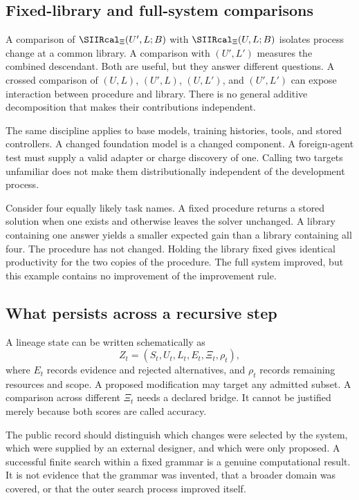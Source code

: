 \subsection{Fixed-library and full-system comparisons}
A comparison of $\SIIRcal_\Xi(U',L;B)$ with $\SIIRcal_\Xi(U,L;B)$ isolates process change at a common library. A comparison with $(U',L')$ measures the combined descendant. Both are useful, but they answer different questions. A crossed comparison of $(U,L)$, $(U',L)$, $(U,L')$, and $(U',L')$ can expose interaction between procedure and library. There is no general additive decomposition that makes their contributions independent.

The same discipline applies to base models, training histories, tools, and stored controllers. A changed foundation model is a changed component. A foreign-agent test must supply a valid adapter or charge discovery of one. Calling two targets unfamiliar does not make them distributionally independent of the development process.

\begin{SIIcounterexample}\label{SII:ex:library}
Consider four equally likely task names. A fixed procedure returns a stored solution when one exists and otherwise leaves the solver unchanged. A library containing one answer yields a smaller expected gain than a library containing all four. The procedure has not changed. Holding the library fixed gives identical productivity for the two copies of the procedure. The full system improved, but this example contains no improvement of the improvement rule.
\end{SIIcounterexample}

\subsection{What persists across a recursive step}
A lineage state can be written schematically as
\[
Z_t=(S_t,U_t,L_t,E_t,\Xi_t,\rho_t),
\]
where $E_t$ records evidence and rejected alternatives, and $\rho_t$ records remaining resources and scope. A proposed modification may target any admitted subset. A comparison across different $\Xi_t$ needs a declared bridge. It cannot be justified merely because both scores are called accuracy.

The public record should distinguish which changes were selected by the system, which were supplied by an external designer, and which were only proposed. A successful finite search within a fixed grammar is a genuine computational result. It is not evidence that the grammar was invented, that a broader domain was covered, or that the outer search process improved itself.

